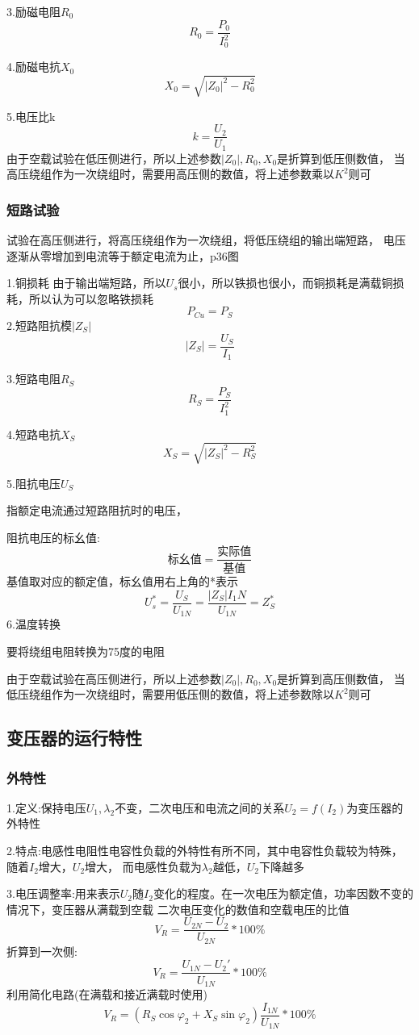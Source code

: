 \documentclass[11pt,twoside,a4paper]{ctexart}
\begin{document}
3.励磁电阻$R_0 $
\[R_0 = \frac{P_0}{I_0^2} \]

4.励磁电抗$ X_0 $
\[X_0 = \sqrt{|Z_0|^2 - R_0^2}\]

5.电压比k
\[k = \frac{U_2}{U_1}\]
由于空载试验在低压侧进行，所以上述参数$|Z_0|, R_0,X_0$是折算到低压侧数值，
当高压绕组作为一次绕组时，需要用高压侧的数值，将上述参数乘以$K^2 $则可
\subsubsection{短路试验}
试验在高压侧进行，将高压绕组作为一次绕组，将低压绕组的输出端短路，
电压逐渐从零增加到电流等于额定电流为止，p36图

1.铜损耗
由于输出端短路，所以$U_s$很小，所以铁损也很小，而铜损耗是满载铜损耗，所以认为可以忽略铁损耗
\[P_{Cu} = P_S \]
2.短路阻抗模$|Z_S| $
\[|Z_S| = \frac{U_S}{I_1}\]

3.短路电阻$R_S $
\[R_S = \frac{P_S}{I_1^2}\]

4.短路电抗$X_S $
\[X_S = \sqrt{|Z_S|^2 - R_S^2}\]

5.阻抗电压$U_S $

指额定电流通过短路阻抗时的电压，

阻抗电压的标幺值:
\[\text{标幺值} = \frac{\text{实际值}}{\text{基值}} \]
基值取对应的额定值，标幺值用右上角的*表示
\[U_s^* = \frac{U_S}{U_{1N}} = \frac{|Z_S|I_1N}{U_{1N}} = Z_S^*\]
6.温度转换

要将绕组电阻转换为75度的电阻

由于空载试验在高压侧进行，所以上述参数$|Z_0|, R_0,X_0$是折算到高压侧数值，
当低压绕组作为一次绕组时，需要用低压侧的数值，将上述参数除以$K^2 $则可
\subsection{变压器的运行特性}
\subsubsection{外特性}
1.定义:保持电压$U_1,\lambda _2$不变，二次电压和电流之间的关系$U_2 = f(I_2)$为变压器的外特性

2.特点:电感性电阻性电容性负载的外特性有所不同，其中电容性负载较为特殊，随着$I_2$增大，$U_2$增大，
而电感性负载为$\lambda _2 $越低，$U_2$下降越多

3.电压调整率:用来表示$U_2$随$I_2$变化的程度。在一次电压为额定值，功率因数不变的情况下，变压器从满载到空载
二次电压变化的数值和空载电压的比值
\[V_R = \frac{U_{2N} - U_2}{U_{2N}}*100\%\]
折算到一次侧:
\[V_R = \frac{U_{1N} - U_2'}{U_{1N}}*100\%\]
利用简化电路(在满载和接近满载时使用)
\[V_R = (R_S\cos\varphi _2 + X_S\sin\varphi _2)\frac{I_{1N}}{U_{1N}}*100\%\]
\end{document}
